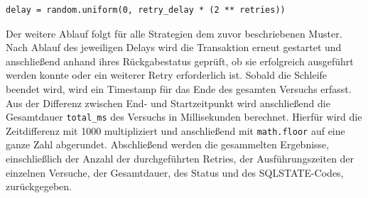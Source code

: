 \begin{lstlisting}[style=pythoncode, caption={Berechnung des Delay mit Backoff + Jitter}, label={lst:jitter}]
delay = random.uniform(0, retry_delay * (2 ** retries))
\end{lstlisting}

Der weitere Ablauf folgt für alle Strategien dem zuvor beschriebenen Muster.
Nach Ablauf des jeweiligen Delays wird die Transaktion erneut gestartet und anschließend anhand ihres
Rückgabestatus geprüft, ob sie erfolgreich ausgeführt werden konnte oder ein weiterer Retry erforderlich ist.
Sobald die Schleife beendet wird, wird ein Timestamp für das Ende des gesamten Versuchs erfasst.
Aus der Differenz zwischen End- und Startzeitpunkt wird anschließend die Gesamtdauer \texttt{total\_ms} des Versuchs
in Millisekunden berechnet.
Hierfür wird die Zeitdifferenz mit 1000 multipliziert und anschließend mit \texttt{math.floor} auf eine ganze Zahl
abgerundet.
Abschließend werden die gesammelten Ergebnisse, einschließlich der Anzahl der durchgeführten Retries, der
Ausführungszeiten der einzelnen Versuche, der Gesamtdauer, des Status und des SQLSTATE-Codes, zurückgegeben.

